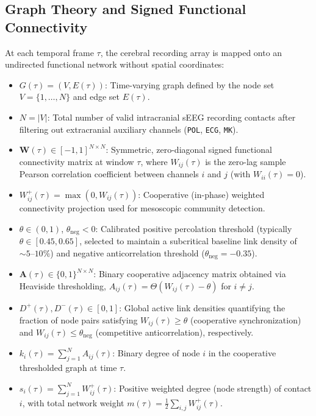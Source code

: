 \subsection{Graph Theory and Signed Functional Connectivity}
At each temporal frame $\tau$, the cerebral recording array is mapped onto an undirected functional network without spatial coordinates:

\begin{itemize}
    \item $G(\tau) = (V, E(\tau))$: Time-varying graph defined by the node set $V = \{1, \dots, N\}$ and edge set $E(\tau)$.
    \item $N = |V|$: Total number of valid intracranial sEEG recording contacts after filtering out extracranial auxiliary channels (\texttt{POL}, \texttt{ECG}, \texttt{MK}).
    \item $\mathbf{W}(\tau) \in [-1, 1]^{N \times N}$: Symmetric, zero-diagonal signed functional connectivity matrix at window $\tau$, where $W_{ij}(\tau)$ is the zero-lag sample Pearson correlation coefficient between channels $i$ and $j$ (with $W_{ii}(\tau) = 0$).
    \item $W_{ij}^{+}(\tau) = \max(0, W_{ij}(\tau))$: Cooperative (in-phase) weighted connectivity projection used for mesoscopic community detection.
    \item $\theta \in (0, 1)$, $\theta_{\text{neg}} < 0$: Calibrated positive percolation threshold (typically $\theta \in [0.45, 0.65]$, selected to maintain a subcritical baseline link density of $\sim 5\text{--}10\%$) and negative anticorrelation threshold ($\theta_{\text{neg}} = -0.35$).
    \item $\mathbf{A}(\tau) \in \{0, 1\}^{N \times N}$: Binary cooperative adjacency matrix obtained via Heaviside thresholding, $A_{ij}(\tau) = \Theta(W_{ij}(\tau) - \theta)$ for $i \neq j$.
    \item $D^{+}(\tau), D^{-}(\tau) \in [0, 1]$: Global active link densities quantifying the fraction of node pairs satisfying $W_{ij}(\tau) \geq \theta$ (cooperative synchronization) and $W_{ij}(\tau) \leq \theta_{\text{neg}}$ (competitive anticorrelation), respectively.
    \item $k_i(\tau) = \sum_{j=1}^N A_{ij}(\tau)$: Binary degree of node $i$ in the cooperative thresholded graph at time $\tau$.
    \item $s_i(\tau) = \sum_{j=1}^N W_{ij}^{+}(\tau)$: Positive weighted degree (node strength) of contact $i$, with total network weight $m(\tau) = \frac{1}{2}\sum_{i,j} W_{ij}^{+}(\tau)$.
\end{itemize}

